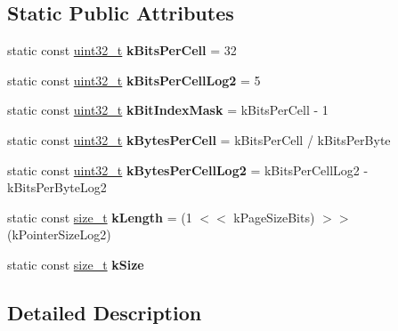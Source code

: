 \subsection*{Static Public Attributes}
\begin{DoxyCompactItemize}
\item 
\mbox{\label{classv8_1_1internal_1_1Bitmap_ae863e06b48d36390b61adb7a17cf3b8a}} 
static const \mbox{\hyperlink{classuint32__t}{uint32\+\_\+t}} {\bfseries k\+Bits\+Per\+Cell} = 32
\item 
\mbox{\label{classv8_1_1internal_1_1Bitmap_ac36de25dc5fe77ac7d032806046f8b7a}} 
static const \mbox{\hyperlink{classuint32__t}{uint32\+\_\+t}} {\bfseries k\+Bits\+Per\+Cell\+Log2} = 5
\item 
\mbox{\label{classv8_1_1internal_1_1Bitmap_ab1aa75c88deb4ec9719b36f43b72ddff}} 
static const \mbox{\hyperlink{classuint32__t}{uint32\+\_\+t}} {\bfseries k\+Bit\+Index\+Mask} = k\+Bits\+Per\+Cell -\/ 1
\item 
\mbox{\label{classv8_1_1internal_1_1Bitmap_a080e9299f086ebfb682fbc658845faf9}} 
static const \mbox{\hyperlink{classuint32__t}{uint32\+\_\+t}} {\bfseries k\+Bytes\+Per\+Cell} = k\+Bits\+Per\+Cell / k\+Bits\+Per\+Byte
\item 
\mbox{\label{classv8_1_1internal_1_1Bitmap_a3c76e7d38fe4a2c25b7f973ebdd9ae64}} 
static const \mbox{\hyperlink{classuint32__t}{uint32\+\_\+t}} {\bfseries k\+Bytes\+Per\+Cell\+Log2} = k\+Bits\+Per\+Cell\+Log2 -\/ k\+Bits\+Per\+Byte\+Log2
\item 
\mbox{\label{classv8_1_1internal_1_1Bitmap_a7767d3d50dcd1efdc3c5427dcb62168e}} 
static const \mbox{\hyperlink{classsize__t}{size\+\_\+t}} {\bfseries k\+Length} = (1 $<$$<$ k\+Page\+Size\+Bits) $>$$>$ (k\+Pointer\+Size\+Log2)
\item 
static const \mbox{\hyperlink{classsize__t}{size\+\_\+t}} {\bfseries k\+Size}
\end{DoxyCompactItemize}


\subsection{Detailed Description}


